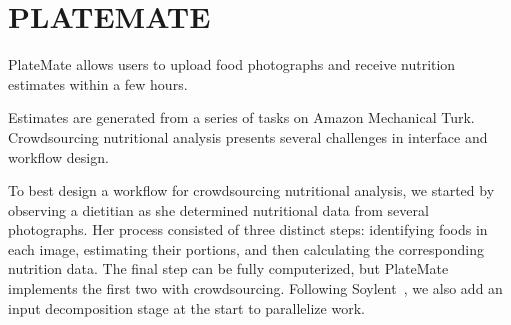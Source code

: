 

\section{PLATEMATE}
PlateMate allows users to upload food photographs and receive
nutrition estimates within a few hours. 

Estimates are generated from a
series of tasks on Amazon Mechanical Turk. Crowdsourcing nutritional
analysis presents several challenges in interface and workflow
design. 

To best design a workflow for crowdsourcing nutritional analysis, we
started by observing a dietitian as she determined nutritional data
from several photographs.  Her process consisted of three distinct
steps: identifying foods in each image, estimating their portions, and
then calculating the corresponding nutrition data. The final step can
be fully computerized, but PlateMate implements the first two with
crowdsourcing. Following Soylent~\cite{bernstein2010soylent}, we also
add an input decomposition stage at the start to parallelize work.

